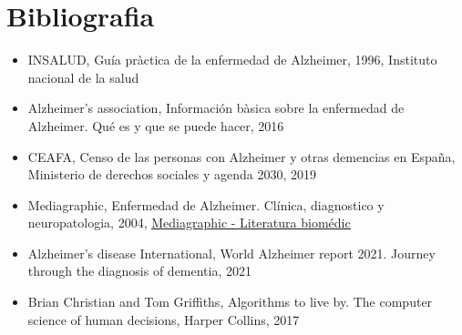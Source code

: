 \documentclass[a4paper,12pt]{report}
\begin{document}
\chapter*{Bibliografia}
\begin{itemize}
    \item INSALUD, Guía pràctica de la enfermedad de Alzheimer, 1996, Instituto nacional de la salud
    \item Alzheimer’s association, Información bàsica sobre la enfermedad de Alzheimer. Qué es y que se puede hacer, 2016
    \item CEAFA, Censo de las personas con Alzheimer y otras demencias en España, Ministerio de derechos sociales y agenda 2030, 2019
    \item Mediagraphic, Enfermedad de Alzheimer. Clínica, diagnostico y neuropatologia, 2004, \href{https://www.medigraphic.com/newMedi/}{\underline{Mediagraphic - Literatura biomédic}}
    \item Alzheimer’s disease International, World Alzheimer report 2021. Journey through the diagnosis of dementia, 2021
    \item Brian Christian and Tom Griffiths, Algorithms to live by. The computer science of human decisions, Harper Collins, 2017
\end{itemize}
\end{document}
